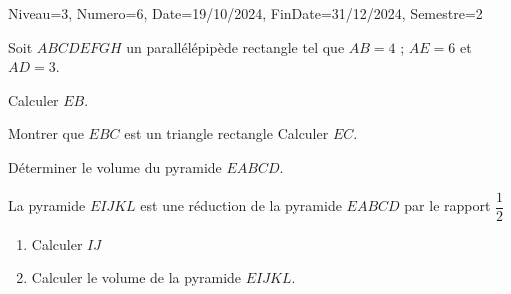\documentclass[a4paper,12pt]{article}
\begin{document}
\begin{Maquette}[DM]{Niveau=3, Numero=6, Date=19/10/2024, FinDate=31/12/2024, Semestre=2}
\begin{exercice}
Soit $ABCDEFGH$ un parallélépipède rectangle tel que $AB=4$ ; $AE=6$ et $AD=3$.
\begin{enumerate}
\begin{minipage}{.7\linewidth}
\item Calculer $EB$.
\item Montrer que $EBC$ est un triangle rectangle  Calculer $EC$.
\item Déterminer le volume du pyramide $EABCD$.
\item La pyramide $EIJKL$ est une réduction de la pyramide $EABCD$ par le rapport $\dfrac{1}{2}$ 
\begin{enumerate}
\item Calculer $IJ$
\item Calculer le volume de la pyramide $EIJKL$.
\end{enumerate}
\end{minipage}%
\begin{minipage}{.3\linewidth}

\end{minipage}
\end{enumerate}
\end{exercice}

\end{Maquette}
\end{document}
